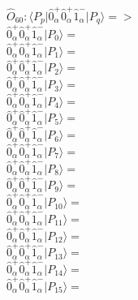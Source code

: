 \documentclass[14pt]{article}
\begin{document}
    $\hat{O}_{60}:  \langle{P_p}\vert \hat{0}_{\alpha}^{+}\hat{0}_{\alpha}^{+}\hat{1}_{\alpha}^{-} \vert{P_q}\rangle => $ \\ 
    $ \hat{0}_{\alpha}^{+}\hat{0}_{\alpha}^{+}\hat{1}_{\alpha}^{-} \vert{P_{0}}\rangle =  $ \\ 
    $ \hat{0}_{\alpha}^{+}\hat{0}_{\alpha}^{+}\hat{1}_{\alpha}^{-} \vert{P_{1}}\rangle =  $ \\ 
    $ \hat{0}_{\alpha}^{+}\hat{0}_{\alpha}^{+}\hat{1}_{\alpha}^{-} \vert{P_{2}}\rangle =  $ \\ 
    $ \hat{0}_{\alpha}^{+}\hat{0}_{\alpha}^{+}\hat{1}_{\alpha}^{-} \vert{P_{3}}\rangle =  $ \\ 
    $ \hat{0}_{\alpha}^{+}\hat{0}_{\alpha}^{+}\hat{1}_{\alpha}^{-} \vert{P_{4}}\rangle =  $ \\ 
    $ \hat{0}_{\alpha}^{+}\hat{0}_{\alpha}^{+}\hat{1}_{\alpha}^{-} \vert{P_{5}}\rangle =  $ \\ 
    $ \hat{0}_{\alpha}^{+}\hat{0}_{\alpha}^{+}\hat{1}_{\alpha}^{-} \vert{P_{6}}\rangle =  $ \\ 
    $ \hat{0}_{\alpha}^{+}\hat{0}_{\alpha}^{+}\hat{1}_{\alpha}^{-} \vert{P_{7}}\rangle =  $ \\ 
    $ \hat{0}_{\alpha}^{+}\hat{0}_{\alpha}^{+}\hat{1}_{\alpha}^{-} \vert{P_{8}}\rangle =  $ \\ 
    $ \hat{0}_{\alpha}^{+}\hat{0}_{\alpha}^{+}\hat{1}_{\alpha}^{-} \vert{P_{9}}\rangle =  $ \\ 
    $ \hat{0}_{\alpha}^{+}\hat{0}_{\alpha}^{+}\hat{1}_{\alpha}^{-} \vert{P_{10}}\rangle =  $ \\ 
    $ \hat{0}_{\alpha}^{+}\hat{0}_{\alpha}^{+}\hat{1}_{\alpha}^{-} \vert{P_{11}}\rangle =  $ \\ 
    $ \hat{0}_{\alpha}^{+}\hat{0}_{\alpha}^{+}\hat{1}_{\alpha}^{-} \vert{P_{12}}\rangle =  $ \\ 
    $ \hat{0}_{\alpha}^{+}\hat{0}_{\alpha}^{+}\hat{1}_{\alpha}^{-} \vert{P_{13}}\rangle =  $ \\ 
    $ \hat{0}_{\alpha}^{+}\hat{0}_{\alpha}^{+}\hat{1}_{\alpha}^{-} \vert{P_{14}}\rangle =  $ \\ 
    $ \hat{0}_{\alpha}^{+}\hat{0}_{\alpha}^{+}\hat{1}_{\alpha}^{-} \vert{P_{15}}\rangle =  $ \\ 
    
\end{document}
